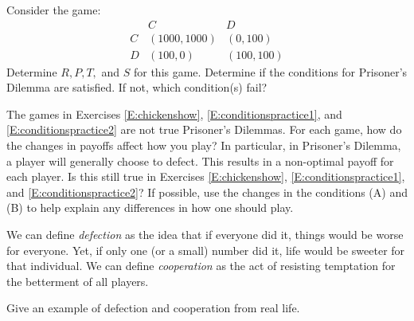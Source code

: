 \begin{xca}\label{E:conditionspractice2}
Consider the game:
\[\begin{matrix}
& C& D\\
C& (1000, 1000) & (0, 100)\\
D &(100, 0) & (100, 100)
\end{matrix}\]
Determine $R, P, T,$ and $S$ for this game. Determine if the conditions for Prisoner's Dilemma are satisfied. If not, which condition(s) fail?
\end{xca}

\begin{xca}\label{E:conditionscompare}
The games in Exercises \ref{E:chickenshow}, \ref{E:conditionspractice1}, and \ref{E:conditionspractice2} are not true Prisoner's Dilemmas. For each game, how do the changes in payoffs affect how you play? In particular, in Prisoner's Dilemma, a player will generally choose to defect. This results in a non-optimal payoff for each player. Is this still true in Exercises \ref{E:chickenshow}, \ref{E:conditionspractice1}, and \ref{E:conditionspractice2}? If possible, use the changes in the conditions (A) and (B) to help explain any differences in how one should play. 
\end{xca}


We can define \emph{defection} as the idea that if everyone did it, things would be worse for everyone. Yet, if only one (or a small) number did it, life would be sweeter for that individual. We can define \emph{cooperation} as the act of resisting temptation for the betterment of all players.


\begin{xca}\label{E:reallifeex}
Give an example of defection and cooperation from real life.
\end{xca}






 